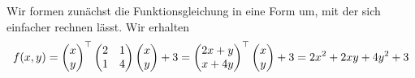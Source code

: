 \documentclass{exercise}
\begin{document}
	Wir formen zunächst die Funktionsgleichung in eine Form um, mit der sich einfacher rechnen lässt.
	Wir erhalten
	\[
		f\parentheses*{x, y} = \begin{pmatrix}
			x\\
			y
		\end{pmatrix}^\top \begin{pmatrix}
			2 & 1\\
			1 & 4
		\end{pmatrix}\begin{pmatrix}
			x\\
			y
		\end{pmatrix} + 3 = \begin{pmatrix}
			2x + y\\
			x + 4y
		\end{pmatrix}^\top \begin{pmatrix}
			x\\
			y
		\end{pmatrix} + 3 = 2x^2 + 2xy + 4y^2 + 3
	\]
\end{document}
